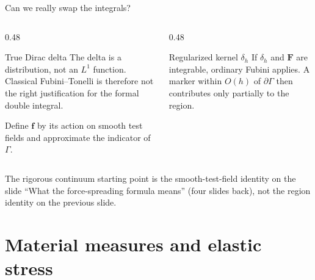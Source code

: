 \documentclass[aspectratio=169,11pt]{beamer}
\newcommand{\fvec}{\bm{f}}
\newcommand{\Fvec}{\bm{F}}
\begin{document}
\begin{frame}{Can we really swap the integrals?}
\begin{columns}[T,onlytextwidth]
  \begin{column}{0.48\textwidth}
  \begin{block}{True Dirac delta}
  The delta is a distribution, not an \(L^1\) function. Classical Fubini--Tonelli is therefore not the right justification for the formal double integral.

  Define \(\fvec\) by its action on smooth test fields and approximate the indicator of \(\Gamma\).
  \end{block}
  \end{column}
  \begin{column}{0.48\textwidth}
  \begin{block}{Regularized kernel \(\delta_h\)}
  If \(\delta_h\) and \(\Fvec\) are integrable, ordinary Fubini applies. A marker within \(O(h)\) of \(\partial\Gamma\) then contributes only partially to the region.
  \end{block}
  \end{column}
\end{columns}
\vspace{4pt}
\begin{punchbox}
The rigorous continuum starting point is the smooth-test-field identity on the slide ``What the force-spreading formula means'' (four slides back), not the region identity on the previous slide.
\end{punchbox}
\end{frame}

\section{Material measures and elastic stress}
\end{document}
